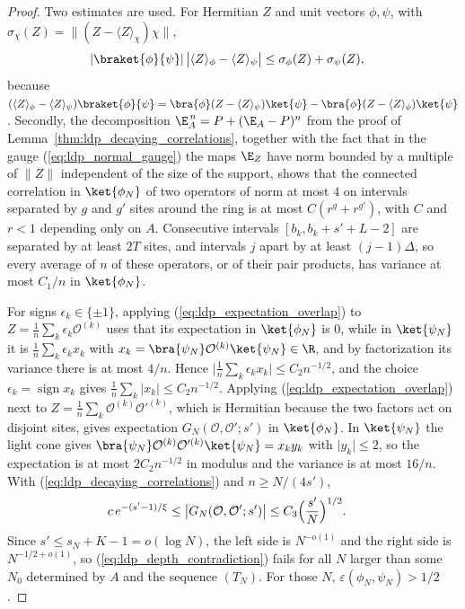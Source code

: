 \begin{proof}
    Two estimates are used. For Hermitian $Z$ and unit vectors $\phi,\psi$,
    with $\sigma_\chi(Z)=\lVert(Z-\langle Z\rangle_\chi)\chi\rVert$,
    \begin{align}
        \lvert\braket{\phi}{\psi}\rvert\,
        \bigl\lvert\langle Z\rangle_\phi-\langle Z\rangle_\psi\bigr\rvert
         & \le\sigma_\phi(Z)+\sigma_\psi(Z),
        \label{eq:ldp_expectation_overlap}
    \end{align}
    because
    $(\langle Z\rangle_\phi-\langle Z\rangle_\psi)\braket{\phi}{\psi}
        =\bra{\phi}(Z-\langle Z\rangle_\psi)\ket{\psi}
        -\bra{\phi}(Z-\langle Z\rangle_\phi)\ket{\psi}$. Secondly, the
    decomposition $\E_A^{\,n}=P+(\E_A-P)^n$ from the proof of
    Lemma~\ref{thm:ldp_decaying_correlations}, together with the fact that in
    the gauge (\ref{eq:ldp_normal_gauge}) the maps $\E_Z$ have norm bounded by
    a multiple of $\lVert Z\rVert$ independent of the size of the support,
    shows that the connected correlation in $\ket{\phi_N}$ of two operators of
    norm at most $4$ on intervals separated by $g$ and $g'$ sites around the
    ring is at most $C(r^g+r^{g'})$, with $C$ and $r<1$ depending only on $A$.
    Consecutive intervals $[b_k,b_k+s'+L-2]$ are separated by at least $2T$
    sites, and intervals $j$ apart by at least $(j-1)\Delta$, so every
    average of $n$ of these operators, or of their pair products, has
    variance at most $C_1/n$ in $\ket{\phi_N}$.

    For signs $\epsilon_k\in\{\pm1\}$, applying (\ref{eq:ldp_expectation_overlap})
    to $Z=\frac1n\sum_k\epsilon_k\mathcal O^{(k)}$ uses that its expectation in
    $\ket{\phi_N}$ is $0$, while in $\ket{\psi_N}$ it is
    $\frac1n\sum_k\epsilon_kx_k$ with
    $x_k=\bra{\psi_N}\mathcal O^{(k)}\ket{\psi_N}\in\R$, and by factorization
    its variance there is at most $4/n$. Hence
    $\lvert\frac1n\sum_k\epsilon_kx_k\rvert\le C_2n^{-1/2}$, and the choice
    $\epsilon_k=\operatorname{sign}x_k$ gives
    $\frac1n\sum_k\lvert x_k\rvert\le C_2n^{-1/2}$. Applying
    (\ref{eq:ldp_expectation_overlap}) next to
    $Z=\frac1n\sum_k\mathcal O^{(k)}\mathcal O'^{(k)}$, which is Hermitian
    because the two factors act on disjoint sites, gives expectation
    $G_N(\mathcal O,\mathcal O';s')$ in $\ket{\phi_N}$. In $\ket{\psi_N}$ the
    light cone gives
    $\bra{\psi_N}\mathcal O^{(k)}\mathcal O'^{(k)}\ket{\psi_N}=x_ky_k$ with
    $\lvert y_k\rvert\le2$, so the expectation is at most $2C_2n^{-1/2}$ in
    modulus and the variance is at most $16/n$. With
    (\ref{eq:ldp_decaying_correlations}) and $n\ge N/(4s')$,
    \begin{align}
        c\,e^{-(s'-1)/\xi}
         & \le\bigl\lvert G_N(\mathcal O,\mathcal O';s')\bigr\rvert
        \le C_3\Bigl(\frac{s'}{N}\Bigr)^{1/2}.
        \label{eq:ldp_depth_contradiction}
    \end{align}
    Since $s'\le s_N+K-1=o(\log N)$, the left side is $N^{-o(1)}$ and the
    right side is $N^{-1/2+o(1)}$, so (\ref{eq:ldp_depth_contradiction}) fails
    for all $N$ larger than some $N_0$ determined by $A$ and the sequence
    $(T_N)$. For those $N$, $\varepsilon(\phi_N,\psi_N)>1/2$.


\end{proof}
